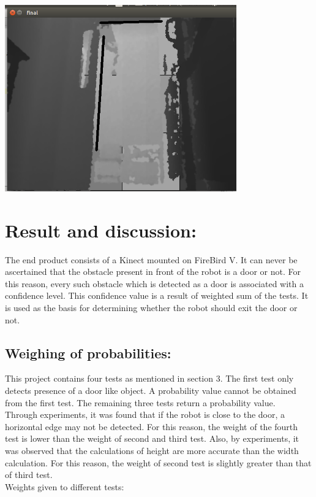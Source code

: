 \documentclass{report}
\begin{document}
\includegraphics[width = 10cm]{horizontal.png}

\chapter{Result and discussion:} 
The end product consists of a Kinect mounted on FireBird V. It can never be ascertained that the obstacle present in front of
the robot is a door or not. For this reason, every such obstacle which is detected as a door is associated with a confidence
level. This confidence value is a result of weighted sum of the tests. It is used as the basis for determining whether the robot
should exit the door or not.

\section{Weighing of probabilities:}

This project contains four tests as mentioned in section 3. The first test only detects presence of a door like object. A probability
value cannot be obtained from the first test. The remaining three tests return a probability value. \\
Through experiments, it was found that
if the robot is close to the door, a horizontal edge may not be detected. For this reason, the weight of the fourth test is lower than the weight of second and third test.
Also, by experiments, it was observed that the calculations of height are more accurate than the width calculation. For this reason, the weight of
second test is slightly greater than that of third test.\\
Weights given to  different tests:\\
\pagebreak
\end{document}

